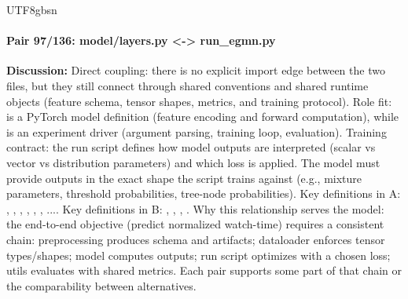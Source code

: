 \documentclass[11pt]{article}
\begin{document}
\begin{CJK*}{UTF8}{gbsn}
\paragraph{Pair 97/136: model/layers.py <-> run\_egmn.py}
\textbf{Discussion:} Direct coupling: there is no explicit import edge between the two files, but they still connect through shared conventions and shared runtime objects (feature schema, tensor shapes, metrics, and training protocol). Role fit: \texttt{} is a PyTorch model definition (feature encoding and forward computation), while \texttt{} is an experiment driver (argument parsing, training loop, evaluation). Training contract: the run script defines how model outputs are interpreted (scalar vs vector vs distribution parameters) and which loss is applied. The model must provide outputs in the exact shape the script trains against (e.g., mixture parameters, threshold probabilities, tree-node probabilities). Key definitions in A: \texttt{}, \texttt{}, \texttt{}, \texttt{}, \texttt{}, \texttt{}, .... Key definitions in B: \texttt{}, \texttt{}, \texttt{}, \texttt{}. Why this relationship serves the model: the end-to-end objective (predict normalized watch-time) requires a consistent chain: preprocessing produces schema and artifacts; dataloader enforces tensor types/shapes; model computes outputs; run script optimizes with a chosen loss; utils evaluates with shared metrics. Each pair supports some part of that chain or the comparability between alternatives.


\end{CJK*}
\end{document}
